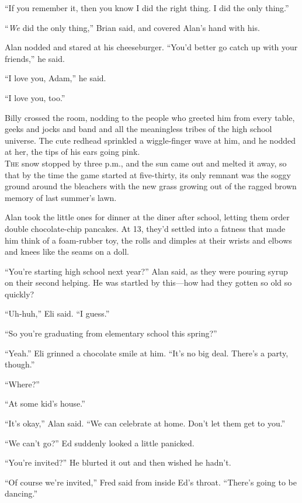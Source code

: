 \documentclass{article}
\begin{document}
``If you remember it, then you know I did the right thing.  I did the
only thing.''

``\textit{We} did the only thing,'' Brian said, and covered Alan's
hand with his.

Alan nodded and stared at his cheeseburger.  ``You'd better go catch
up with your friends,'' he said.

``I love you, Adam,'' he said.

``I love you, too.''

Billy crossed the room, nodding to the people who greeted him from
every table, geeks and jocks and band and all the meaningless tribes
of the high school universe.  The cute redhead sprinkled a
wiggle-finger wave at him, and he nodded at her, the tips of his ears
going pink.
\\
\lettrine[lines=3, lhang=.5, nindent=0pt, findent=2pt]{T}{he} snow stopped by three p.m., and the sun came out and melted it
away, so that by the time the game started at five-thirty, its only
remnant was the soggy ground around the bleachers with the new grass
growing out of the ragged brown memory of last summer's lawn.

Alan took the little ones for dinner at the diner after school,
letting them order double chocolate-chip pancakes.  At 13, they'd
settled into a fatness that made him think of a foam-rubber toy, the
rolls and dimples at their wrists and elbows and knees like the seams
on a doll.

``You're starting high school next year?'' Alan said, as they were
pouring syrup on their second helping.  He was startled by this---how
had they gotten so old so quickly?

``Uh-huh,'' Eli said.  ``I guess.''

``So you're graduating from elementary school this spring?''

``Yeah.'' Eli grinned a chocolate smile at him.  ``It's no big deal. 
There's a party, though.''

``Where?''

``At some kid's house.''

``It's okay,'' Alan said.  ``We can celebrate at home.  Don't let them
get to you.''

``We can't go?'' Ed suddenly looked a little panicked.

``You're invited?'' He blurted it out and then wished he hadn't.

``Of course we're invited,'' Fred said from inside Ed's throat. 
``There's going to be dancing.''
\end{document}
